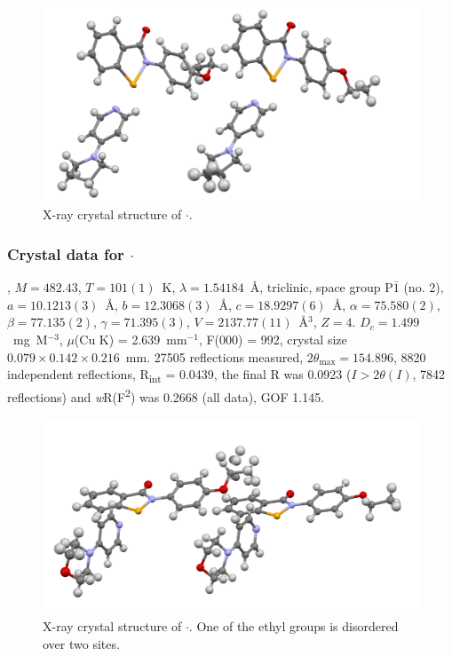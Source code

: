 \begin{refsection}
\begin{figure}
  \includegraphics[width=0.6\linewidth]{Figures/ebs-4oet-pyrrol-xtal.pdf}
  \caption{X-ray crystal structure of \texorpdfstring{$ \cdot $}{C24 H25 N3 O2 Se}.}
\end{figure}

\subsubsection{Crystal data for \texorpdfstring{$ \cdot $}{C24 H25 N3 O3 Se}}
, $M=482.43$, $T=101(1)$~K, $\lambda=1.54184$~\AA, triclinic, space group P$\bar{1}$ (no. 2), $a = 10.1213(3)$~\AA, $b = 12.3068(3)$~\AA, $c = 18.9297(6)$~\AA, $\alpha = 75.580(2)$\degree, $\beta = 77.135(2)$\degree, $\gamma = 71.395(3)$\degree, $V = 2137.77(11)$~\AA$^{3}$, $Z = 4$. $D_{c}= 1.499$~mg~M$^{-3}$, $\mu$(Cu K\a) = 2.639~mm$^{-1}$, F(000) = 992, crystal size $0.079 \times 0.142 \times 0.216$~mm. 27505 reflections measured, $2\theta_{\max}=154.896$\degree, 8820 independent reflections, R\textsubscript{int} = 0.0439, the final R was 0.0923 ($I > 2\theta(I)$, 7842 reflections) and \textit{w}R(F\textsuperscript{2}) was 0.2668 (all data), GOF 1.145.

\begin{figure}
  \includegraphics[width=0.6\linewidth]{Figures/ebs-4oet-morph-xtal.pdf}
  \caption[X-ray crystal structure of \texorpdfstring{$ \cdot $}{C24 H25 N3 O3 Se}.]{X-ray crystal structure of \texorpdfstring{$ \cdot $}{C24 H25 N3 O3 Se}. One of the ethyl groups is disordered over two sites.}
\end{figure}



\end{refsection}
